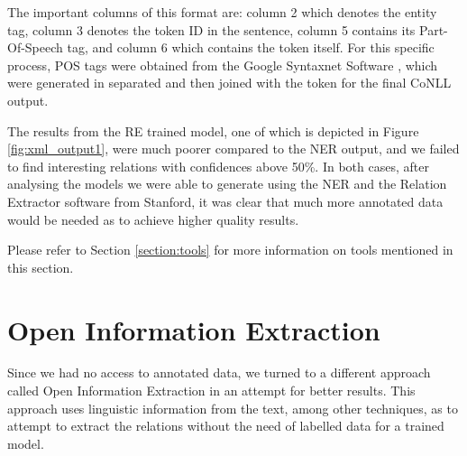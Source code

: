 \documentclass[11pt,a4paper,openright]{memoir}
\begin{document}
The important columns of this format are: column 2 which denotes the entity tag, column 3 denotes the token ID in the sentence, column 5 contains its Part-Of-Speech tag, and column 6 which contains the token itself. For this specific process, POS tags were obtained from the Google Syntaxnet Software \cite{google-syntaxnet, DBLP:journals/corr/AndorAWSPGPC16}, which were generated in separated and then joined with the token for the final CoNLL output.

The results from the RE trained model, one of which is depicted in Figure \ref{fig:xml_output1}, were much poorer compared to the NER output, and we failed to find interesting relations with confidences above 50\%. In both cases, after analysing the models we were able to generate using the NER and the Relation Extractor software from Stanford, it was clear that much more annotated data would be needed as to achieve higher quality results.

Please refer to Section \ref{section:tools} for more information on tools mentioned in this section.


%
%
%
%


\section{Open Information Extraction}
\label{section:related}

Since we had no access to annotated data, we turned to a different approach called Open Information Extraction in an attempt for better results. This approach uses linguistic information from the text, among other techniques, as to attempt to extract the relations without the need of labelled data for a trained model.
\end{document}
